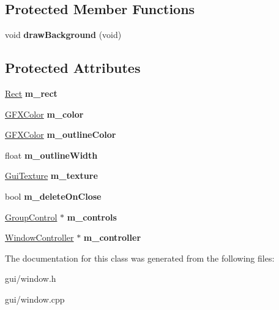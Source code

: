\subsection*{Protected Member Functions}
\begin{DoxyCompactItemize}
\item 
void {\bfseries draw\+Background} (void)\hypertarget{classWindow_aabb141ca3cab6d196253002e2fbe0a0c}{}\label{classWindow_aabb141ca3cab6d196253002e2fbe0a0c}

\end{DoxyCompactItemize}
\subsection*{Protected Attributes}
\begin{DoxyCompactItemize}
\item 
\hyperlink{classRect}{Rect} {\bfseries m\+\_\+rect}\hypertarget{classWindow_a50e4c8426e965d0d806aae7fbfacee9b}{}\label{classWindow_a50e4c8426e965d0d806aae7fbfacee9b}

\item 
\hyperlink{structGFXColor}{G\+F\+X\+Color} {\bfseries m\+\_\+color}\hypertarget{classWindow_ad74cae96a8db44e8c6a4e355f6c01f8b}{}\label{classWindow_ad74cae96a8db44e8c6a4e355f6c01f8b}

\item 
\hyperlink{structGFXColor}{G\+F\+X\+Color} {\bfseries m\+\_\+outline\+Color}\hypertarget{classWindow_a8e3c6f1b05a77852a4f4353ba4fa1ce9}{}\label{classWindow_a8e3c6f1b05a77852a4f4353ba4fa1ce9}

\item 
float {\bfseries m\+\_\+outline\+Width}\hypertarget{classWindow_a1c9b9dbb2e6a9a4e8ab011bf97c90bae}{}\label{classWindow_a1c9b9dbb2e6a9a4e8ab011bf97c90bae}

\item 
\hyperlink{classGuiTexture}{Gui\+Texture} {\bfseries m\+\_\+texture}\hypertarget{classWindow_ad5aa2c246ab9bc160c5635e34d2affa7}{}\label{classWindow_ad5aa2c246ab9bc160c5635e34d2affa7}

\item 
bool {\bfseries m\+\_\+delete\+On\+Close}\hypertarget{classWindow_aa82791781cbc0f0e8fd091a0f89eefcb}{}\label{classWindow_aa82791781cbc0f0e8fd091a0f89eefcb}

\item 
\hyperlink{classGroupControl}{Group\+Control} $\ast$ {\bfseries m\+\_\+controls}\hypertarget{classWindow_afd4ae06daa1e160e80e8db2583a6f44c}{}\label{classWindow_afd4ae06daa1e160e80e8db2583a6f44c}

\item 
\hyperlink{classWindowController}{Window\+Controller} $\ast$ {\bfseries m\+\_\+controller}\hypertarget{classWindow_a67642ee5ff6fa3b594ea4a5d20182734}{}\label{classWindow_a67642ee5ff6fa3b594ea4a5d20182734}

\end{DoxyCompactItemize}


The documentation for this class was generated from the following files\+:\begin{DoxyCompactItemize}
\item 
gui/window.\+h\item 
gui/window.\+cpp\end{DoxyCompactItemize}
